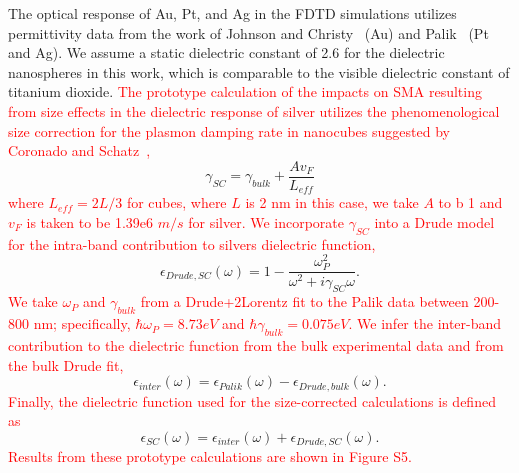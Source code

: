 \documentclass[journal=jpclcd,manuscript=suppinfo]{achemso}
\begin{document}
The optical response of Au, Pt, and Ag in the FDTD simulations utilizes permittivity 
data from the work of Johnson and Christy~\cite{JC_PRB_1972} (Au) and Palik~\cite{Palik} (Pt and Ag).  
We assume a static dielectric constant of 2.6 for
the dielectric nanospheres in this work, which is comparable to the visible dielectric constant of titanium dioxide. 
\textcolor{red}{The prototype calculation of the impacts on SMA resulting from size effects in the dielectric response
of silver utilizes the phenomenological size correction for the plasmon damping rate in nanocubes suggested by 
Coronado and Schatz~\cite{CS_JCP_2003},}
\begin{equation}
\gamma_{SC} = \gamma_{bulk} + \frac{A v_F}{L_{eff}}
\end{equation}
\textcolor{red}{where $L_{eff} = 2 L/3$ for cubes, where $L$ is 2 nm in this case, we take $A$ to b 1
and $v_F$ is taken to be 1.39e6 $m/s$ for silver.    
We incorporate $\gamma_{SC}$ into a Drude model for the intra-band contribution to silvers dielectric function,}
\begin{equation}
\epsilon_{Drude,SC}(\omega) = 1 - \frac{\omega_P^2}{\omega^2 + i\gamma_{SC}\omega}.
\end{equation}
\textcolor{red}{We take $\omega_P$ and $\gamma_{bulk}$ from a Drude+2Lorentz fit to the Palik data between 200-800 nm;
specifically, $\hbar \omega_P = 8.73 eV$ and $\hbar \gamma_{bulk} = 0.075 eV$.  We infer the
inter-band contribution to the dielectric function from the bulk experimental data and from the bulk Drude fit,}
\begin{equation}
\epsilon_{inter}(\omega) = \epsilon_{Palik}(\omega) - \epsilon_{Drude,bulk}(\omega).
\end{equation}
\textcolor{red}{Finally, the dielectric function used for the size-corrected calculations is defined as}
\begin{equation}
\epsilon_{SC}(\omega) = \epsilon_{inter}(\omega) + \epsilon_{Drude,SC}(\omega).
\end{equation}
\textcolor{red}{Results from these prototype calculations are shown in Figure S5.}
 
\end{document}
